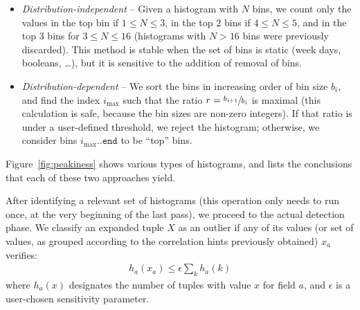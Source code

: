 \begin{figure*}
  \centering
  \caption{Sample histograms, and corresponding decisions with distribution-dependent (\(D\)-independent) and distribution-independent (\(D\)-independent) thresholds. Each figure shows a sorted histogram, with the top bins hatched (in dotted green in the distribution-independent case, and in solid orange in the distribution-dependent case). The vertical arrows show the small value \(r=3\) in the distribution-dependent case. The weaknesses of the distribution-independent-model show in the third and fourth plots: in the third one the distribution-dependent strategy correctly rejects because of the small \(r\); in the fourth the distribution-independent strategy yields an incorrect threshold.}
  \label{fig:peakiness}
\end{figure*}

\begin{itemize}
\item \emph{Distribution-independent} -- Given a histogram with $N$ bins, we count only the values in the top bin if $1 \leq N \leq 3$, in the top $2$ bins if $4 \leq N \leq 5$, and in the top $3$ bins for $3 \leq N \leq 16$ (histograms with $N > 16$ bins were previously discarded). This method is stable when the set of bins is static (week days, booleans, \ldots), but it is sensitive to the addition of removal of bins.
\item \emph{Distribution-dependent} -- We sort the bins in increasing order of bin size $b_i$, and find the index $i_{\max}$ such that the ratio $r = \sfrac{b_{i+1}}{b_{i}}$ is maximal (this calculation is safe, because the bin sizes are non-zero integers). If that ratio is under a user-defined threshold, we reject the histogram; otherwise, we consider bins $i_{\max} .. \texttt{end}$ to be ``top'' bins.
\end{itemize}

Figure~\ref{fig:peakiness} shows various types of histograms, and lists the conclusions that each of these two approaches yield.

After identifying a relevant set of histograms (this operation only needs to run once, at the very beginning of the last pass), we proceed to the actual detection phase. We classify an expanded tuple $X$ as an outlier if any of its values (or set of values, as grouped according to the correlation hints previously obtained) $x_a$ verifies:
\begin{align}
h_a(x_a) \le \epsilon \sum_k h_a(k)
\label{eqn:hist-outlier}
\end{align}
where $h_a(x)$ designates the number of tuples with value $x$ for field $a$, and $\epsilon$ is a user-chosen sensitivity parameter.

